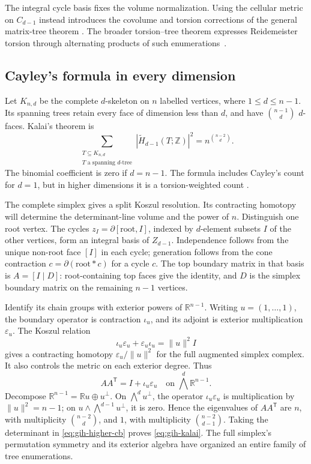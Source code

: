 \documentclass[11pt]{article}
\theoremstyle{definition}
\theoremstyle{remark}
\newcommand{\Z}{\mathbb Z}
\newcommand{\R}{\mathbb R}
\begin{document}
The integral cycle basis fixes the volume normalization. Using the
cellular metric on \(C_{d-1}\) instead introduces the covolume and
torsion corrections of the general matrix-tree theorem
\cite{gih-dkm-matrix,derived-catanzaro-chernyak-klein}. The broader
torsion--tree theorem expresses Reidemeister torsion through alternating
products of such enumerations~\cite{derived-catanzaro-chernyak-klein}.

\subsection{Cayley's formula in every dimension}

Let \(K_{n,d}\) be the complete \(d\)-skeleton on \(n\) labelled
vertices, where \(1\le d\le n-1\).  Its spanning trees retain every
face of dimension less than \(d\), and have \(\binom{n-1}{d}\)
\(d\)-faces.  Kalai's theorem is
\begin{equation}
 \boxed{\displaystyle
 \sum_{\substack{T\subseteq K_{n,d}\\
             T\text{ a spanning }d\text{-tree}}}
 |\widetilde H_{d-1}(T;\Z)|^2
       =n^{\binom{n-2}{d}}.}
 \label{eq:gih-kalai}
\end{equation}
The binomial coefficient is zero if \(d=n-1\).  The formula includes
Cayley's count for \(d=1\), but in higher dimensions it is a
torsion-weighted count \cite{gih-kalai}.

The complete simplex gives a split Koszul resolution. Its contracting homotopy will determine the determinant-line volume and the power of $n$.  Distinguish one root vertex.  The cycles
\(z_I=\partial[\text{root},I]\), indexed by \(d\)-element subsets
\(I\) of the other vertices, form an integral basis of
\(Z_{d-1}\).  Independence follows from the unique non-root face
\([I]\) in each cycle; generation follows from the cone contraction
\(c=\partial(\text{root}*c)\) for a cycle \(c\).  The top boundary
matrix in that basis is
\(A=[I\mid D]\): root-containing top faces give the identity, and
\(D\) is the simplex boundary matrix on the remaining \(n-1\) vertices.

Identify its chain groups with exterior powers of \(\R^{n-1}\).
Writing $u=(1,\ldots,1)$, the boundary operator is contraction
$\iota_u$, and its adjoint is exterior multiplication
$\varepsilon_u$. The Koszul relation
\[
 \iota_u\varepsilon_u+\varepsilon_u\iota_u=\|u\|^2I
\]
gives a contracting homotopy $\varepsilon_u/\|u\|^2$ for the full augmented simplex complex. It also controls the metric on each exterior degree. Thus
\[
 AA^{\mathsf T}=I+\iota_u\varepsilon_u
                  \quad\text{on }\bigwedge^d\R^{n-1}.
\]
Decompose \(\R^{n-1}=\R u\oplus u^\perp\).  On
\(\bigwedge^d u^\perp\), the operator \(\iota_u\varepsilon_u\)
is multiplication by \(\|u\|^2=n-1\); on
\(u\wedge\bigwedge^{d-1}u^\perp\), it is zero.  Hence the eigenvalues
of \(AA^{\mathsf T}\) are \(n\), with multiplicity
\(\binom{n-2}{d}\), and \(1\), with multiplicity
\(\binom{n-2}{d-1}\).  Taking the determinant in
\eqref{eq:gih-higher-cb} proves \eqref{eq:gih-kalai}.
The full simplex's permutation symmetry and its exterior algebra have
organized an entire family of tree enumerations.
\end{document}

